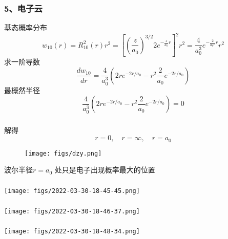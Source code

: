 	


\begin{frame}[label=current]
  \frametitle{ 5、电子云}
\解 基态概率分布
  $$
w_{10}(r)=R_{10}^2(r) r^2=\left[\left(\frac{z}{a_0}\right)^{3 / 2} 2 e^{-\frac{z}{a_0} r}\right]^2 r^2=\frac{4}{a_0^3} e^{-\frac{2}{a_0 r} r} r^2
$$
求一阶导数
$$
\frac{d w_{10}}{d r}=\frac{4}{a_0^3}\left(2 r e^{-2 r / a_0}-r^2 \frac{2}{a_0} e^{-2 r / a_0}\right)
$$
最概然半径
$$
\frac{4}{a_0^3}\left(2 r e^{-2 r / a_0}-r^2 \frac{2}{a_0} e^{-2 r / a_0} \right) =0 
$$
\end{frame} 

\begin{frame}[label=current]
  \frametitle{}
  解得
  $$
  r=0, \quad r=\infty, \quad  r=a_0
  $$
\begin{figure}[htbp]
  \centering
  \texttt{[image: figs/dzy.png]}
\end{figure}
波尔半径$ r=a_0  $ 处只是电子出现概率最大的位置 
\end{frame} 

\begin{frame}
	\frametitle{}
  \begin{center}
	   \texttt{[image: figs/2022-03-30-18-45-45.png]}
  \end{center}
\end{frame}

\begin{frame}
	\frametitle{}
  \begin{center}
	   \texttt{[image: figs/2022-03-30-18-46-37.png]}
  \end{center}
\end{frame}

\begin{frame}
	\frametitle{}
  \begin{center}
	   \texttt{[image: figs/2022-03-30-18-48-34.png]}
  \end{center}
\end{frame}

